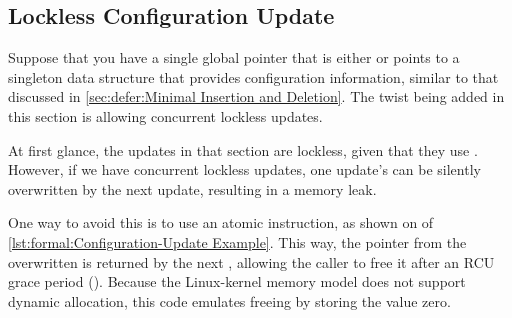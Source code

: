 \subsection{Lockless Configuration Update}
\label{sec:together:Lockless Configuration Update}

Suppose that you have a single global pointer that is either 
or points to a singleton data structure that provides configuration
information, similar to that discussed in
\cref{sec:defer:Minimal Insertion and Deletion}.
The twist being added in this section is allowing concurrent lockless
updates.

\begin{listing}

\caption{Configuration-Update Example}
\label{lst:formal:Configuration-Update Example}
\end{listing}

At first glance, the updates in that section are lockless, given that
they use .
However, if we have concurrent lockless updates, one update's
 can be silently overwritten by the next update,
resulting in a memory leak.
\begin{fcvref}
One way to avoid this is to use an atomic  instruction,
as shown on  of
\cref{lst:formal:Configuration-Update Example}.
This way, the pointer from the overwritten  is returned by
the next , allowing the caller to free it after an RCU
grace period ().
Because the Linux-kernel memory model does not support dynamic allocation,
this code emulates freeing by storing the value zero.
\end{fcvref}

